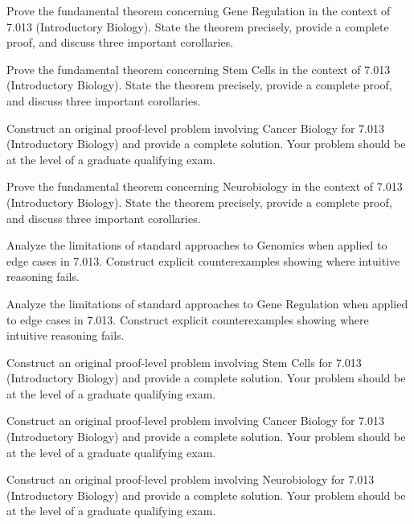 \documentclass[12pt,a4paper]{exam}
\begin{document}
\begin{questions}
\vspace{0.3cm}

\question[5]
Prove the fundamental theorem concerning Gene Regulation in the context of 7.013 (Introductory Biology). State the theorem precisely, provide a complete proof, and discuss three important corollaries.

\vspace{0.3cm}

\question[4]
Prove the fundamental theorem concerning Stem Cells in the context of 7.013 (Introductory Biology). State the theorem precisely, provide a complete proof, and discuss three important corollaries.

\vspace{0.3cm}

\question[3]
Construct an original proof-level problem involving Cancer Biology for 7.013 (Introductory Biology) and provide a complete solution. Your problem should be at the level of a graduate qualifying exam.

\vspace{0.3cm}

\question[4]
Prove the fundamental theorem concerning Neurobiology in the context of 7.013 (Introductory Biology). State the theorem precisely, provide a complete proof, and discuss three important corollaries.

\vspace{0.3cm}

\question[2]
Analyze the limitations of standard approaches to Genomics when applied to edge cases in 7.013. Construct explicit counterexamples showing where intuitive reasoning fails.

\vspace{0.3cm}

\question[7]
Analyze the limitations of standard approaches to Gene Regulation when applied to edge cases in 7.013. Construct explicit counterexamples showing where intuitive reasoning fails.

\vspace{0.3cm}

\question[3]
Construct an original proof-level problem involving Stem Cells for 7.013 (Introductory Biology) and provide a complete solution. Your problem should be at the level of a graduate qualifying exam.

\vspace{0.3cm}

\question[4]
Construct an original proof-level problem involving Cancer Biology for 7.013 (Introductory Biology) and provide a complete solution. Your problem should be at the level of a graduate qualifying exam.

\vspace{0.3cm}

\question[6]
Construct an original proof-level problem involving Neurobiology for 7.013 (Introductory Biology) and provide a complete solution. Your problem should be at the level of a graduate qualifying exam.

\vspace{0.3cm}

\end{questions}
\end{document}
